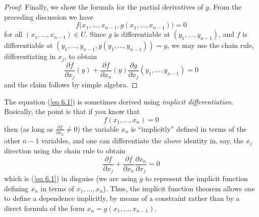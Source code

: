 \begin{proof}
    Finally, we show the formula for the partial derivatives of \(g\).
    From the preceding discussion we have
    \[
        f\big(x_1, \dots, x_{n - 1}, g(x_1, \dots, x_{n - 1})\big) = 0
    \]
    for all \((x_1, \dots, x_{n - 1}) \in U\).
    Since \(g\) is differentiable at \((y_1, \dots, y_{n - 1})\), and \(f\) is differentiable at \((y_1, \dots, y_{n - 1}, g(y_1, \dots, y_{n - 1})) = y\), we may use the chain rule, differentiating in \(x_j\), to obtain
    \[
        \frac{\partial f}{\partial x_j}(y) + \frac{\partial f}{\partial x_n}(y) \frac{\partial g}{\partial x_j}(y_1, \dots, y_{n - 1}) = 0
    \]
    and the claim follows by simple algebra.
\end{proof}

\begin{remark}\label{6.8.2}
    The equation (\ref{eq 6.1}) is sometimes derived using \emph{implicit differentiation}.
    Basically, the point is that if you know that
    \[
        f(x_1, \dots, x_n) = 0
    \]
    then (as long as \(\frac{\partial f}{\partial x_n} \neq 0\)) the variable \(x_n\) is ``implicitly'' defined in terms of the other \(n - 1\) variables, and one can differentiate the above identity in, say, the \(x_j\) direction using the chain rule to obtain
    \[
        \frac{\partial f}{\partial x_j} + \frac{\partial f}{\partial x_n} \frac{\partial x_n}{\partial x_j} = 0
    \]
    which is (\ref{eq 6.1}) in disguise
    (we are using \(g\) to represent the implicit function defining \(x_n\) in terms of \(x_1, \dots, x_n\)).
    Thus, the implicit function theorem allows one to define a dependence implicitly, by means of a constraint rather than by a direct formula of the form \(x_n = g(x_1, \dots, x_{n - 1})\).
\end{remark}

